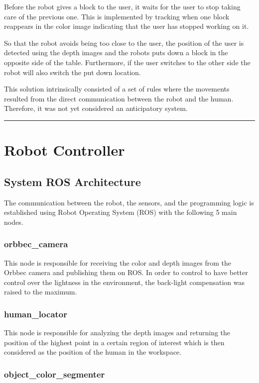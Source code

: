{Before the robot gives a block to the user, it waits for the user to stop taking care of the previous one. This is implemented by tracking when one block reappears in the color image indicating that the user has stopped working on it.

So that the robot avoids being too close to the user, the position of the user is detected using the depth images and the robots puts down a block in the opposite side of the table. Furthermore, if the user switches to the other side the robot will also switch the put down location.

This solution intrinsically consisted of a set of rules where the movements resulted from the direct communication between the robot and the human. Therefore, it was not yet considered an anticipatory system.
}
{\color{red} \rule{\linewidth}{0.5mm}}

\section{Robot Controller}

\subsection{System ROS Architecture}

The communication between the robot, the sensors, and the programming logic is established using Robot Operating System (ROS) with the following 5 main nodes.

\subsubsection{orbbec\_camera}

This node is responsible for receiving the color and depth images from the Orbbec camera and publishing them on ROS. In order to control to have better control over the lightness in the environment, the back-light compensation was raised to the maximum.

\subsubsection{human\_locator}

This node is responsible for analyzing the depth images and returning the position of the highest point in a certain region of interest which is then considered as the position of the human in the workspace.

\subsubsection{object\_color\_segmenter}

